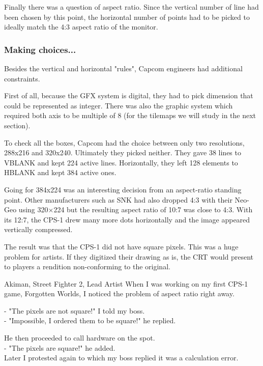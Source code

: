 Finally there was a question of aspect ratio. Since the vertical number of line had been chosen by this point, the horizontal number of points had to be picked to ideally match the 4:3 aspect ratio of the monitor.


\subsubsection{Making choices...}
Besides the vertical and horizontal "rules", Capcom engineers had additional constraints.

First of all, because the GFX system is digital, they had to pick dimension that could be represented as integer. There was also the graphic system which required both axis to be multiple of 8 (for the tilemaps we will study in the next section).

To check all the boxes, Capcom had the choice between only two resolutions, 288x216 and 320x240. Ultimately they picked neither. They gave 38 lines to VBLANK and kept 224 active lines\cite{petitCRT}. Horizontally, they left 128 elements to HBLANK and kept 384 active ones.  

Going for 384x224 was an interesting decision from an aspect-ratio standing point. Other manufacturers such as SNK had also dropped 4:3 with their Neo-Geo using 320×224 but the resulting aspect ratio of 10:7 was close to 4:3. With its 12:7, the CPS-1 drew many more dots horizontally and the image appeared vertically compressed. 




The result was that the CPS-1 did not have square pixels. This was a huge problem for artists. If they digitized their drawing as is, the CRT would present to players a rendition non-conforming to the original.


\begin{q}{Akiman, Street Fighter 2, Lead Artist\cite{akiman}}
When I was working on my first CPS-1 game, Forgotten Worlds, I noticed the problem of aspect ratio right away. 

- "The pixels are not square!" I told my boss.\\ 
- "Impossible, I ordered them to be square!" he replied.

He then proceeded to call hardware on the spot.\\ 
- "The pixels are square!" he added.\\ 

Later I protested again to which my boss replied it was a calculation error.
\end{q}


